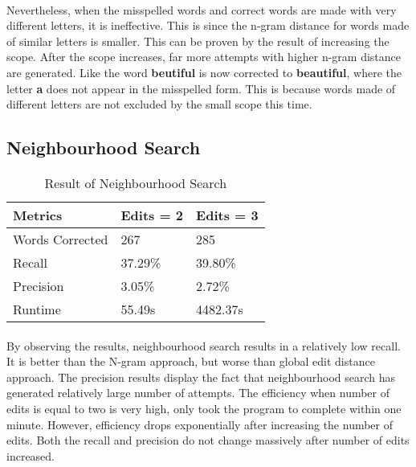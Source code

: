 \documentclass[11pt]{article}
\begin{document}
      \paragraph{}
      Nevertheless, when the misspelled words and correct words are made with
      very different letters, it is ineffective. This is since the n-gram distance
      for words made of similar letters is smaller. This can be proven by the
      result of increasing the scope. After the scope increases, far more attempts
      with higher n-gram distance are generated. Like the word \textbf{beutiful}
      is now corrected to \textbf{beautiful}, where the letter \textbf{a} does not
      appear in the misspelled form.
      This is because words made of different letters are not excluded by the
      small scope this time.

  \subsection{Neighbourhood Search}
    \begin{table}[h]
      \begin{center}
        \begin{tabular}{|l|l|l|}
          \hline
          Metrics & Edits = 2 & Edits = 3\\
          \hline\hline
          Words Corrected & 267 & 285\\
          \hline
          Recall & 37.29\% & 39.80\% \\
          \hline
          Precision & 3.05\% & 2.72\% \\
          \hline
          Runtime & 55.49s & 4482.37s\\
          \hline
        \end{tabular}
        \caption{Result of Neighbourhood Search}\label{table5}
      \end{center}
    \end{table}

    \paragraph{}
    By observing the results, neighbourhood search results in a relatively low recall.
    It is better than the N-gram approach, but worse than global edit distance
    approach. The precision results display the fact that neighbourhood search
    has generated relatively large number of attempts. The efficiency when
    number of edits is equal to two is very high, only took the program to complete
    within one minute.
    However, efficiency drops exponentially after increasing the number of edits.
    Both the recall and precision do not change massively after number of edits
    increased.
\end{document}
